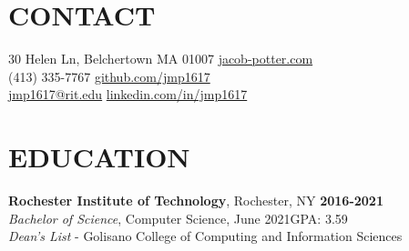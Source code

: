 \documentclass[line,margin]{res}
\begin{document}

\begin{resume}

\section{CONTACT}
30 Helen Ln, Belchertown MA 01007\hfill 
\href{https://jacob-potter.com}{jacob-potter.com}\\
(413) 335-7767\hfill 
\href{https://github.com/jmp1617}{github.com/jmp1617}\\
\href{mailto:jmp1617@rit.edu}{jmp1617@rit.edu}\hfill 
\href{https://linkedin.com/in/jmp1617}{linkedin.com/in/jmp1617}

\section{EDUCATION}
\textbf{Rochester Institute of Technology}, Rochester, NY\hfill
    \textbf{2016-2021}\\
{\sl Bachelor of Science}, Computer Science, June 2021\hfill GPA: 3.59
\\
{\sl Dean's List} - Golisano College of Computing and Information Sciences


\end{resume}
\end{document}
